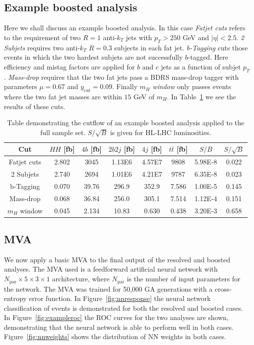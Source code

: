 \documentclass[12pt]{article}
\begin{document}
\subsection{Example boosted analysis}
Here we shall discuss an example boosted analysis. In this case \emph{Fatjet cuts} refers to the requirement of two $R=1$ anti-$k_T$ jets with $p_T>250$ GeV and $|\eta| < 2.5$. \emph{2 Subjets} requires two anti-$k_T$ $R=0.3$ subjects in each fat jet. \emph{b-Tagging} cuts those events in which the two hardest subjets are not successfully $b$-tagged. Here efficiency and mistag factors are applied for $b$ and $c$ jets as a function of subjet $p_T$. \emph{Mass-drop } requires that the two fat jets pass a BDRS mass-drop tagger with parameters $\mu = 0.67$ and $y_{\mathrm{cut}} = 0.09$. Finally \emph{$m_H$ window} only passes events where the two fat jet masses are within $15$ GeV of $m_H$. In Table~\ref{tab:boostedCutflow} we see the results of these cuts.
\begin{table}[htdp]
\begin{center}
\begin{tabular}{|c||c||c|c|c|c||c|c|}
\hline
Cut 					& $HH$ [fb] & $4b$ [fb] & $2b2j$ [fb] & $4j$ [fb] & $t\bar{t}$ [fb] & $S/B$ & $S/\sqrt{B}$ \\
\hline
\hline
Fatjet cuts 			&2.802           	&3045 	& 1.13E6 &	4.57E7    &       9808  & 5.98E-8 &0.022 \\
2 Subjets  	&	2.740 	&2694	& 1.01E6	&	4.21E7 	&	9787  &6.35E-8 & 0.023\\
b-Tagging    			& 0.070		&39.76	& 296.9		&	352.9            &      7.586 & 1.00E-5& 0.145\\
Mass-drop  		& 0.068 		&36.84	& 256.0    	&	305.1            &	7.514 & 1.12E-4& 0.151 \\
\hline
$m_H$ window       		&   0.045		& 2.134	& 10.83	& 	0.630            & 	0.438 & 3.20E-3& 0.658\\
\hline
\end{tabular}
\end{center}
\caption{Table demonstrating the cutflow of an example boosted analysis applied to the full sample set. $S/\sqrt{B}$ is given for HL-LHC luminosities.}
\label{tab:boostedCutflow}
\end{table}%


\subsection{MVA}
We now apply a basic MVA to the final output of the resolved and boosted analyses. The MVA used is a feedforward artificial neural network with $N_{\mathrm{par}}\times5\times3\times1$ architecture, where $N_{\mathrm{par}}$ is the number of input parameters for the network. The MVA was trained for 50,000 GA generations with a cross-entropy error function. In Figure~\ref{fig:nnresponse} the neural network classification of events is demonstrated for both the resolved and boosted cases. In Figure~\ref{fig:exampleroc} the ROC curves for the two analyses are shown, demonstrating that the neural network is able to
perform well in both cases. Figure~\ref{fig:nnweights} shows the distribution of NN weights in both cases.
\end{document}
